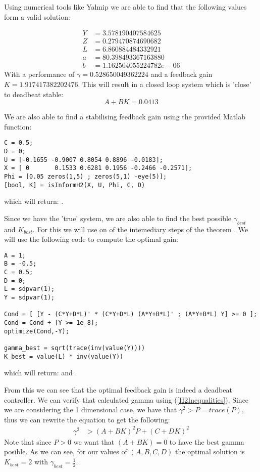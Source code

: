 Using numerical tools like Yalmip we are able to find that the following values form a valid solution:

\begin{align*}
	Y &= 3.578190407584625 \\
	Z &= 0.279470874690682 \\
	L &= 6.860884484332921 \\
	a &= 80.398493367163880 \\
	b &= 1.162504055224782e-06
\end{align*}
With a performance of $\gamma = 0.528650049362224$ and a feedback gain $K = 1.917417382202476$. This will result in a closed loop system which is 'close' to deadbeat stable:
\begin{equation*}
	A + BK = 0.0413
\end{equation*}

We are also able to find a stabilising feedback gain using the provided Matlab function:
\begin{lstlisting}
C = 0.5;
D = 0;
U = [-0.1655 -0.9007 0.8054 0.8896 -0.0183];
X = [ 0       0.1533 0.6281 0.1956 -0.2466 -0.2571];
Phi = [0.05 zeros(1,5) ; zeros(5,1) -eye(5)];
[bool, K] = isInformH2(X, U, Phi, C, D)
\end{lstlisting}
which will return: \mon{[ 1, 1.917417382202475 ]}.

Since we have the 'true' system, we are also able to find the best possible $\gamma_{best}$ and $K_{best}$. For this we will use on of the intemediary steps of the theorem \cite[Equation 36]{waarde2020noisy}. We will use the following code to compute the optimal gain:
\begin{lstlisting}
A = 1;
B = -0.5;
C = 0.5;
D = 0;
L = sdpvar(1);
Y = sdpvar(1);

Cond = [ [Y - (C*Y+D*L)' * (C*Y+D*L) (A*Y+B*L)' ; (A*Y+B*L) Y] >= 0 ];
Cond = Cond + [Y >= 1e-8];
optimize(Cond,-Y);

gamma_best = sqrt(trace(inv(value(Y))))
K_best = value(L) * inv(value(Y))
\end{lstlisting}
which will return:  and .

From this we can see that the optimal feedback gain is indeed a deadbeat controller. We can verify that calculated gamma using (\ref{H2Inequalities}). Since we are considering the 1 dimensional case, we have that $\gamma^2 > P = trace(P)$, thus we can rewrite the equation to get the following:
\begin{align*}
	\gamma^2 &> (A + BK)^2 P + (C+DK)^2 
\end{align*}
Note that since $P>0$ we want that $(A+BK) = 0$ to have the best gamma posible. As we can see, for our values of $(A,B,C,D)$ the optimal solution is $K_{best} = 2$ with $\gamma_{best} = \frac{1}{2}$.